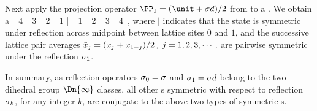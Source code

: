 Next apply the projection operator
\(
\PP_{{1}} = (\unit+\Refl\shift)/2
\)
from 
to a {\lattstate} . We obtain
a {\lattstate}
\beq
\cdots \tilde{\ssp}_{4} \tilde{\ssp}_{3} \tilde{\ssp}_{2} \tilde{\ssp}_{1} |
      \tilde{\ssp}_{1} \tilde{\ssp}_{2} \tilde{\ssp}_{3} \tilde{\ssp}_{4}  \cdots
\,,
where
\(
|
\)
indicates that the state is symmetric under reflection across midpoint
between lattice sites $0$ and $1$, and the successive lattice pair
averages
\(
\tilde{x}_{j} =(x_{j}+x_{1-j})/2
\,,\;
j=1,2,3,\cdots\,,
\)
are pairwise symmetric under the reflection $\sigma_{1}$.

In summary, as reflection operators $\sigma_{0}=\sigma$ and
$\sigma_{1}=\sigma d$ belong to the two dihedral group $\Dn{\infty}$
classes, all other {\lattstate}s symmetric with respect to
reflection $\sigma_{k}$, for any  integer $k$, are conjugate to the above
two types of symmetric {\lattstate}s.

